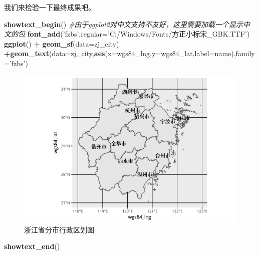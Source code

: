 \documentclass[]{article}
\newenvironment{Shaded}{\begin{snugshade}}{\end{snugshade}}
\newcommand{\CommentTok}[1]{\textcolor[rgb]{0.56,0.35,0.01}{\textit{#1}}}
\newcommand{\DataTypeTok}[1]{\textcolor[rgb]{0.13,0.29,0.53}{#1}}
\newcommand{\KeywordTok}[1]{\textcolor[rgb]{0.13,0.29,0.53}{\textbf{#1}}}
\newcommand{\NormalTok}[1]{#1}
\newcommand{\OperatorTok}[1]{\textcolor[rgb]{0.81,0.36,0.00}{\textbf{#1}}}
\newcommand{\StringTok}[1]{\textcolor[rgb]{0.31,0.60,0.02}{#1}}
\begin{document}
\begin{Shaded}
\end{Shaded}

我们来检验一下最终成果吧。

\begin{Shaded}
\begin{Highlighting}[]
\KeywordTok{showtext_begin}\NormalTok{()                  }\CommentTok{#由于ggplot2对中文支持不友好，这里需要加载一个显示中文的包}
\KeywordTok{font_add}\NormalTok{(}\StringTok{'fzbs'}\NormalTok{,}\DataTypeTok{regular=}\StringTok{'C:/Windows/Fonts/方正小标宋_GBK.TTF'}\NormalTok{)}
\KeywordTok{ggplot}\NormalTok{() }\OperatorTok{+}\StringTok{ }\KeywordTok{geom_sf}\NormalTok{(}\DataTypeTok{data=}\NormalTok{zj_city) }\OperatorTok{+}\KeywordTok{geom_text}\NormalTok{(}\DataTypeTok{data=}\NormalTok{zj_city,}\KeywordTok{aes}\NormalTok{(}\DataTypeTok{x=}\NormalTok{wgs84_lng,}\DataTypeTok{y=}\NormalTok{wgs84_lat,}\DataTypeTok{label=}\NormalTok{name),}\DataTypeTok{family=}\StringTok{'fzbs'}\NormalTok{)}
\end{Highlighting}
\end{Shaded}

\begin{figure}

{\centering \includegraphics{get_border_files/figure-latex/city_map-1} 

}

\caption{浙江省分市行政区划图}\label{fig:city_map}
\end{figure}

\begin{Shaded}
\begin{Highlighting}[]
\KeywordTok{showtext_end}\NormalTok{()}
\end{Highlighting}
\end{Shaded}
\end{document}
